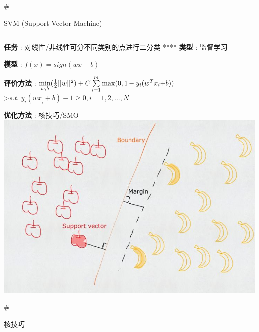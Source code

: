 \documentclass[11pt]{article}
\makeatletter
\def\maxwidth{\ifdim\Gin@nat@width>\linewidth\linewidth
    \else\Gin@nat@width\fi}
\let\Oldincludegraphics\includegraphics
\renewcommand{\includegraphics}[1]{\Oldincludegraphics[width=.8\maxwidth]{#1}}
\makeatother
\begin{document}
    \#

SVM (Support Vector Machine)

\begin{center}\rule{0.5\linewidth}{\linethickness}\end{center}

\textbf{任务} : 对线性/非线性可分不同类别的点进行二分类 ****
\textbf{类型} : 监督学习

\textbf{模型} : \(f(x)=sign(wx+b)\)

\textbf{评价方法} :
\(\mathop {\min }\limits_{w,b} (\frac{1}{2}||w|{|^2}) + C\sum\limits_{i = 1}^m {\max (0,1 - {y_i}({w^T}{x_i}{\rm{ + }}b))}\)\\
\textgreater{}\emph{s.t.}
\({y_i}(w{x_{_i}} + b) - 1 \ge 0,i = 1,2,...,N\)

\textbf{优化方法} : 核技巧/SMO \includegraphics{svm.jpg}

    \#

核技巧
\end{document}
